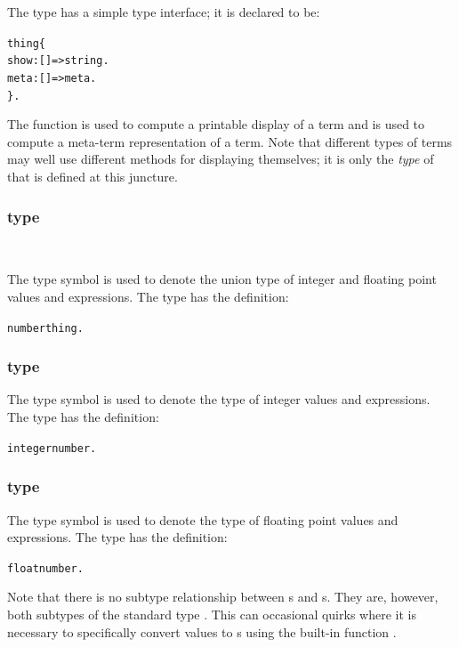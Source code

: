 The  type has a simple type interface; it is declared to be:
\begin{alltt}
thing \impl \{ 
  show:[]=>string.
  meta:[]=>meta.
  \}.
\end{alltt}
The  function is used to compute a printable  display of a term and  is used to compute a meta-term representation of a term. Note that different types of terms may well use different methods for displaying themselves; it is only the \emph{type} of  that is defined at this juncture.
  

\subsubsection{ type}\
\label{types:standard:number}

The  type symbol is used to denote the union type of integer and floating point values and expressions. The \q{number} type has the definition:
\begin{alltt}
number \impl thing.
\end{alltt}

\subsubsection{ type}
\label{types:standard:integer}

The  type symbol is used to denote the type of integer values and expressions. The \q{integer} type has the definition:
\begin{alltt}
integer \impl number.
\end{alltt}

\subsubsection{ type}
\label{types:standard:float}

The  type symbol is used to denote the type of floating point values and expressions. The \q{float} type has the definition:
\begin{alltt}
float \impl number.
\end{alltt}

\begin{aside}
  Note that there is no subtype relationship between s and s. They are, however, both subtypes of the standard type .  This can occasional quirks where it is necessary to specifically convert  values to s using the built-in function .
\end{aside}

